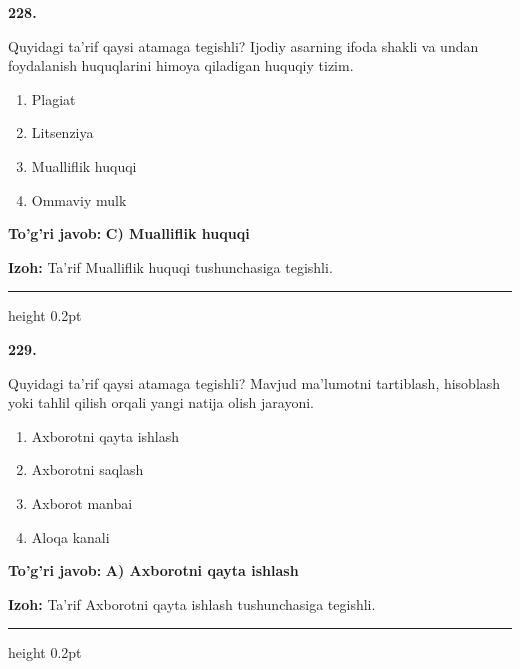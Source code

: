 \documentclass[10pt,a4paper,oneside]{article}
\begin{document}
\noindent\textbf{\color{ink}228.}
\par
Quyidagi ta'rif qaysi atamaga tegishli? Ijodiy asarning ifoda shakli va undan foydalanish huquqlarini himoya qiladigan huquqiy tizim.
\begin{enumerate}[label=\Alph*),leftmargin=9mm]
\item Plagiat
\item Litsenziya
\item Mualliflik huquqi
\item Ommaviy mulk
\end{enumerate}
\begin{tcolorbox}[enhanced,breakable,colback=teal!4,colframe=teal!50!black,boxrule=0.5pt,arc=1.1mm,left=3mm,right=3mm,top=1.7mm,bottom=1.7mm,before skip=2mm,after skip=2mm]
\textbf{\color{teal}To'g'ri javob:} \textbf{C) Mualliflik huquqi}
\par\smallskip
\textbf{Izoh:} Ta'rif Mualliflik huquqi tushunchasiga tegishli.
\end{tcolorbox}
\vspace{2mm}\hrule height 0.2pt \vspace{3mm}

\noindent\textbf{\color{ink}229.}
\par
Quyidagi ta'rif qaysi atamaga tegishli? Mavjud ma'lumotni tartiblash, hisoblash yoki tahlil qilish orqali yangi natija olish jarayoni.
\begin{enumerate}[label=\Alph*),leftmargin=9mm]
\item Axborotni qayta ishlash
\item Axborotni saqlash
\item Axborot manbai
\item Aloqa kanali
\end{enumerate}
\begin{tcolorbox}[enhanced,breakable,colback=teal!4,colframe=teal!50!black,boxrule=0.5pt,arc=1.1mm,left=3mm,right=3mm,top=1.7mm,bottom=1.7mm,before skip=2mm,after skip=2mm]
\textbf{\color{teal}To'g'ri javob:} \textbf{A) Axborotni qayta ishlash}
\par\smallskip
\textbf{Izoh:} Ta'rif Axborotni qayta ishlash tushunchasiga tegishli.
\end{tcolorbox}
\vspace{2mm}\hrule height 0.2pt \vspace{3mm}
\end{document}
